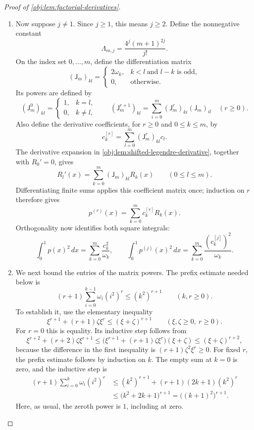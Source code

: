 \begin{proof}[Proof of \cref{obj:lem:factorial-derivatives}]
\begin{enumerate}
\item Now suppose \(j\ne1\). Since \(j\ge1\), this means \(j\ge2\). Define the nonnegative constant
\[
\Lambda_{m,j}=\frac{4^j(m+1)^{2j}}{j!}.
\]
On the index set \(0,\ldots,m\), define the differentiation matrix
\[
(\mathsf J_m)_{kl}
=
\begin{cases}
2\omega_k,&k<l\ \text{and }l-k\text{ is odd},\\
0,&\text{otherwise}.
\end{cases}
\]
Its powers are defined by
\[
(\mathsf J_m^0)_{kl}
=
\begin{cases}
1,&k=l,\\
0,&k\ne l,
\end{cases}
\qquad
(\mathsf J_m^{r+1})_{kl}
=
\sum_{i=0}^m(\mathsf J_m^r)_{ki}(\mathsf J_m)_{il}
\quad(r\ge0).
\]
Also define the derivative coefficients, for \(r\ge0\) and \(0\le k\le m\), by
\[
c_k^{[r]}=\sum_{l=0}^m(\mathsf J_m^r)_{kl}c_l.
\]
The derivative expansion in \cref{obj:lem:shifted-legendre-derivative}, together with \(R_0'=0\), gives
\[
R_l'(x)=\sum_{k=0}^m(\mathsf J_m)_{kl}R_k(x)
\qquad(0\le l\le m).
\]
Differentiating finite sums applies this coefficient matrix once; induction on \(r\) therefore gives
\[
p^{(r)}(x)=\sum_{k=0}^m c_k^{[r]}R_k(x).
\]
Orthogonality now identifies both square integrals:
\[
\int_0^1 p(x)^2\,dx
=
\sum_{k=0}^m\frac{c_k^2}{\omega_k},
\qquad
\int_0^1 p^{(j)}(x)^2\,dx
=
\sum_{k=0}^m\frac{(c_k^{[j]})^2}{\omega_k}.
\]

\item We next bound the entries of the matrix powers. The prefix estimate needed below is
\[
(r+1)\sum_{i=0}^{k-1}\omega_i(i^2)^r
\le
(k^2)^{r+1}
\qquad(k,r\ge0).
\]
To establish it, use the elementary inequality
\[
\xi^{r+1}+(r+1)\zeta\xi^r
\le
(\xi+\zeta)^{r+1}
\qquad(\xi,\zeta\ge0,\ r\ge0).
\]
For \(r=0\) this is equality. Its inductive step follows from
\[
\xi^{r+2}+(r+2)\zeta\xi^{r+1}
\le
\bigl(\xi^{r+1}+(r+1)\zeta\xi^r\bigr)(\xi+\zeta)
\le
(\xi+\zeta)^{r+2},
\]
because the difference in the first inequality is
\((r+1)\zeta^2\xi^r\ge0\).
For fixed \(r\), the prefix estimate follows by induction on \(k\). The empty sum at \(k=0\) is zero, and the inductive step is
\[
\begin{aligned}
(r+1)\sum_{i=0}^{k}\omega_i(i^2)^r
&\le
(k^2)^{r+1}+(r+1)(2k+1)(k^2)^r\\
&\le
\bigl(k^2+2k+1\bigr)^{r+1}
=
\bigl((k+1)^2\bigr)^{r+1}.
\end{aligned}
\]
Here, as usual, the zeroth power is \(1\), including at zero.


\end{enumerate}
\end{proof}
